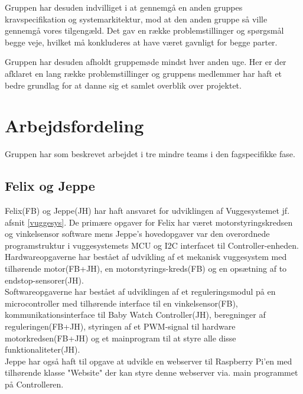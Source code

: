 Gruppen har desuden indvilliget i at gennemgå en anden gruppes kravspecifikation og systemarkitektur, mod at den anden gruppe så ville gennemgå vores tilgengæld. Det gav en række problemstillinger og spørgsmål begge veje, hvilket må konkluderes at have været gavnligt for begge parter.

Gruppen har desuden afholdt gruppemøde mindst hver anden uge. Her er der afklaret en lang række problemstillinger og gruppens medlemmer har haft et bedre grundlag for at danne sig et samlet overblik over projektet. 

\section{Arbejdsfordeling}

Gruppen har som beskrevet arbejdet i tre mindre teams i den fagspecifikke fase. 

\subsection*{Felix og Jeppe}
Felix(FB) og Jeppe(JH) har haft ansvaret for udviklingen af Vuggesystemet jf. afsnit \vref{vuggesys}. De primære opgaver for Felix har været motorstyringskredsen og vinkelsensor software mens Jeppe's hovedopgaver var den overordnede programstruktur i vuggesystemets MCU og I2C interfacet til Controller-enheden.\\ 
Hardwareopgaverne har bestået af udvikling af et mekanisk vuggesystem med tilhørende motor(FB+JH), en motorstyrings-kreds(FB) og en opsætning af to endstop-sensorer(JH).\\
Softwareopgaverne har bestået af udviklingen af et reguleringsmodul på en microcontroller med tilhørende interface til en vinkelsensor(FB), kommunikationsinterface til Baby Watch Controller(JH), beregninger af reguleringen(FB+JH), styringen af et PWM-signal til hardware motorkredsen(FB+JH) og et mainprogram til at styre alle disse funktionaliteter(JH). \\
Jeppe har også haft til opgave at udvikle en webserver til Raspberry Pi'en med tilhørende klasse "Website" der kan styre denne webserver via. main programmet på Controlleren.

